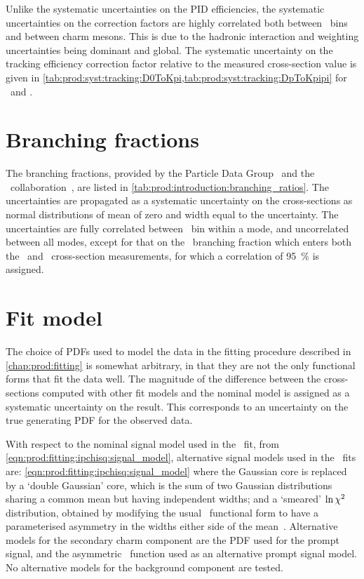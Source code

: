 Unlike the systematic uncertainties on the \ac{PID} efficiencies, the 
systematic uncertainties on the correction factors are highly correlated both 
between \pTy\ bins and between charm mesons.
This is due to the hadronic interaction and weighting uncertainties being 
dominant and global.
The systematic uncertainty on the tracking efficiency correction factor 
relative to the measured cross-section value is given in 
\cref{tab:prod:syst:tracking:D0ToKpi,tab:prod:syst:tracking:DpToKpipi} for 
\DzToKpi\ and \DpToKpipi.

\section{Branching fractions}
\label{chap:prod:syst:bf}

The branching fractions, provided by the Particle Data Group~\cite{PDG2014} and 
the \cleo\ collaboration~\cite{Alexander:2008aa}, are listed in 
\cref{tab:prod:introduction:branching_ratios}.
The uncertainties are propagated as a systematic uncertainty on the 
cross-sections as normal distributions of mean of zero and width equal to the 
uncertainty.
The uncertainties are fully correlated between \pTy\ bin within a mode, and 
uncorrelated between all modes, except for that on the \DzToKpi\ branching 
fraction which enters both the \DzToKpi\ and \DstToDzpi\ cross-section 
measurements, for which a correlation of \SI{95}{\percent} is assigned.

\section{Fit model}
\label{chap:prod:syst:fitting}

The choice of \acp{PDF} used to model the data in the fitting procedure 
described in \cref{chap:prod:fitting} is somewhat arbitrary, in that they are 
not the only functional forms that fit the data well.
The magnitude of the difference between the cross-sections computed with other 
fit models and the nominal model is assigned as a systematic uncertainty on the 
result.
This corresponds to an uncertainty on the true generating \ac{PDF} for the 
observed data.

With respect to the nominal signal model used in the \lnipchisq\ fit, from 
\cref{eqn:prod:fitting:ipchisq:signal_model}, alternative signal models used in 
the \lnipchisq\ fits are: \cref{eqn:prod:fitting:ipchisq:signal_model} where 
the Gaussian core is replaced by a `double Gaussian' core, which is the sum of 
two Gaussian distributions sharing a common mean but having independent widths; 
and a `smeared' $\ln{\ensuremath{\chi^2}}$ distribution, obtained by modifying the usual 
\chisq\ functional form to have a parameterised asymmetry in the widths either 
side of the mean~\cite{LHCb-CONF-2016-010}.
Alternative models for the secondary charm component are the \ac{PDF} used for 
the prompt signal, and the asymmetric \chisq\ function used as an alternative 
prompt signal model.
No alternative models for the background component are tested.


